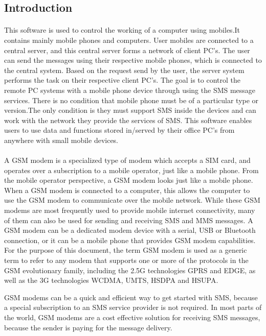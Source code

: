\begin{center}
\section{Introduction}
\end{center}
\paragraph{}
This software is used to control the working of a computer using mobiles.It contains
mainly mobile phones and computers. User mobiles are connected to a central server,
and this central server forms a network of client PC's. The user can send the messages
using their respective mobile phones, which is connected to the central system. Based
on the request send by the user, the server system performs the task on their respective
client PC's.
The goal is to control the remote PC systems with a mobile phone device through
using the SMS message services. There is no condition that mobile phone must be of a
particular type or version.The only condition is they must support SMS inside the devices
and can work with the network they provide the services of SMS. 
This software enables users to use data and functions stored in/served by their office
PC's from anywhere with small mobile devices. 
\paragraph{}
A GSM modem is a specialized type of modem which accepts a SIM card, and operates over a subscription to a mobile operator, just like a mobile phone. From the mobile operator perspective, a GSM modem looks just like a mobile phone.
When a GSM modem is connected to a computer, this allows the computer to use the GSM modem to communicate over the mobile network.  While these GSM modems are most frequently used to provide mobile internet connectivity, many of them can also be used for sending and receiving SMS and MMS messages.
A GSM modem can be a dedicated modem device with a serial, USB or Bluetooth connection, or it can be a mobile phone that provides GSM modem capabilities.
For the purpose of this document, the term GSM modem is used as a generic term to refer to any modem that supports one or more of the protocols in the GSM evolutionary family, including the 2.5G technologies GPRS and EDGE, as well as the 3G technologies WCDMA, UMTS, HSDPA and HSUPA.

GSM modems can be a quick and efficient way to get started with SMS, because a special subscription to an SMS service provider is not required. In most parts of the world, GSM modems are a cost effective solution for receiving SMS messages, because the sender is paying for the message delivery.


